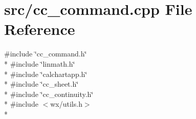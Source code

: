 \hypertarget{a00182}{\section{src/cc\-\_\-command.cpp File Reference}
\label{a00182}
}
{\ttfamily \#include \char`\"{}cc\-\_\-command.\-h\char`\"{}}\\*
{\ttfamily \#include \char`\"{}linmath.\-h\char`\"{}}\\*
{\ttfamily \#include \char`\"{}calchartapp.\-h\char`\"{}}\\*
{\ttfamily \#include \char`\"{}cc\-\_\-sheet.\-h\char`\"{}}\\*
{\ttfamily \#include \char`\"{}cc\-\_\-continuity.\-h\char`\"{}}\\*
{\ttfamily \#include $<$wx/utils.\-h$>$}\\*
